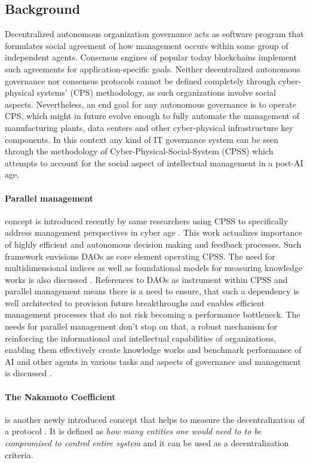\documentclass{article}
\begin{document}
\begin{CJK}{UTF8}{gbsn}
\begin{multicols}{2}
        \section{Background}
        Decentralized autonomous organization governance acts as software program that formulates social agreement of how management occurs within some group of independent agents. Consensus engines of popular today blockchains implement such agreements for application-specific goals. Neither decentralized autonomous governance nor consensus protocols cannot be defined completely through cyber-physical systems' (CPS) \cite{Lee2008} methodology, as such organizations involve social aspects. Nevertheless, an end goal for any autonomous governance is to operate CPS, which might in future evolve enough to fully automate the management of manufacturing plants, data centers and other cyber-physical infrastructure key components. In this context any kind of IT governance system can be seen through the methodology of Cyber-Physical-Social-System (CPSS) \cite{Fei2016} which attempts to account for the social aspect of intellectual management in a post-AI age.

        \paragraph{Parallel management} concept is introduced recently by same researchers using CPSS to specifically address management perspectives in cyber age \cite{Wang2022}. This work actualizes importance of highly efficient and autonomous decision making and feedback processes. Such framework envisions DAOs as core element operating CPSS. The need for multidimensional indices as well as foundational models for measuring knowledge works is also discussed \cite{Juanjuan2023}. References to DAOs as instrument within CPSS and parallel management means there is a need to ensure, that such a dependency is well architected to provision future breakthroughs and enables efficient management processes that do not risk becoming a performance bottleneck. The needs for parallel management don't stop on that, a robust mechanism for reinforcing the informational and intellectual capabilities of organizations, enabling them effectively create knowledge works and benchmark performance of AI and other agents in various tasks and aspects of governance and management is discussed \cite{Wang2022}.
        \paragraph{The Nakamoto Coefficient}  is another newly introduced concept that helps to measure the decentralization of a protocol \cite{Balaji2017}. It is defined as \textit{how many entities one would need to to be compromised to control entire system} and it can be used as a decentralization criteria.


\end{multicols}
\end{CJK}
\end{document}
